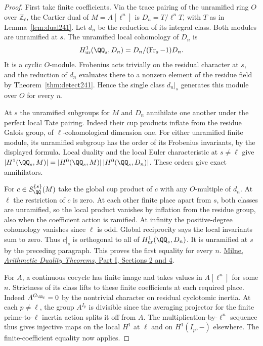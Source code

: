 \documentclass[a4paper,11pt]{article}
\theoremstyle{definition}
\theoremstyle{remark}
\newcommand{\ZZ}{\mathbb Z}\newcommand{\ord}{\operatorname{ord}}
\numberwithin{equation}{section}
\begin{document}
\begin{proof}
First take finite coefficients. Via the trace pairing of the
unramified ring \(O\) over \(\ZZ_\ell\), the Cartier dual of
\(M=A[\ell^n]\) is \(D_n=T/\ell^nT\), with \(T\) as in
Lemma~\ref{lem:dual241}. Let \(d_n\) be the reduction of its
integral class. Both modules are unramified at \(s\). The
unramified local cohomology of \(D_n\) is
\[
 H^1_{\rm ur}(\QQ_s,D_n)
   =D_n/(\operatorname{Fr}_s-1)D_n .
\]
It is a cyclic \(O\)-module. Frobenius acts trivially on the
residual character at \(s\), and the reduction of \(d_n\)
evaluates there to a nonzero element of the residue field by
Theorem~\ref{thm:detect241}. Hence the single class \(d_n|_s\)
generates this module over \(O\) for every \(n\).

At \(s\) the unramified subgroups for \(M\) and \(D_n\)
annihilate one another under the perfect local Tate pairing.
Indeed their cup products inflate from the residue Galois
group, of \(\ell\)-cohomological dimension one. For either
unramified finite module, its unramified subgroup has the
order of its Frobenius invariants, by the displayed formula.
Local duality and the local Euler characteristic at \(s\ne\ell\)
give \(|H^1(\QQ_s,M)|=|H^0(\QQ_s,M)|\,|H^0(\QQ_s,D_n)|\).
These orders give exact annihilators.

For \(c\in S_\QQ^{\{s\}}(M)\) take the global cup product of
\(c\) with any \(O\)-multiple of \(d_n\). At \(\ell\) the
restriction of \(c\) is zero. At each other finite place
apart from \(s\), both classes are unramified, so the local
product vanishes by inflation from the residue group, also
when the coefficient action is ramified. At infinity the
positive-degree cohomology vanishes since \(\ell\) is odd.
Global reciprocity says the local invariants sum to zero.
Thus \(c|_s\) is orthogonal to all of \(H^1_{\rm ur}(\QQ_s,D_n)\).
It is unramified at \(s\) by the preceding paragraph. This
proves the first equality for every \(n\).
\href{https://www.jmilne.org/math/Books/adt.html}{Milne,
\emph{Arithmetic Duality Theorems}, Part I, Sections 2 and 4}.

For \(A\), a continuous cocycle has finite image and takes
values in \(A[\ell^n]\) for some \(n\). Strictness of its
class lifts to these finite coefficients at each required
place. Indeed \(A^{G_{\QQ_\ell}}=0\) by the nontrivial
character on residual cyclotomic inertia. At each \(p\ne\ell\),
the group \(A^{I_p}\) is divisible since the averaging projector
for the finite prime-to-\(\ell\) inertia action splits it off
from \(A\). The multiplication-by-\(\ell^n\) sequence thus
gives injective maps on the local \(H^1\) at \(\ell\) and
on \(H^1(I_p,-)\) elsewhere. The finite-coefficient equality
now applies.


\end{proof}
\end{document}
